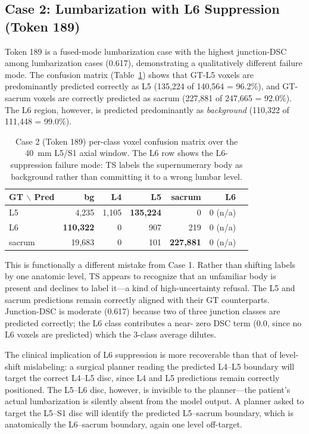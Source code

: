 \documentclass{article}
\begin{document}
\subsection{Case 2: Lumbarization with L6 Suppression
            (Token 189)}
\label{sec:case189}

Token 189 is a fused-mode lumbarization case with the highest
junction-DSC among lumbarization cases (0.617), demonstrating a
qualitatively different failure mode.
The confusion matrix (Table~\ref{tab:case189_confusion}) shows
that GT-L5 voxels are predominantly predicted correctly as L5
(135{,}224 of 140{,}564 = 96.2\%), and GT-sacrum voxels are
correctly predicted as sacrum (227{,}881 of 247{,}665 = 92.0\%).
The L6 region, however, is predicted predominantly as
\emph{background} (110{,}322 of 111{,}448 = 99.0\%).

\begin{table}[t]
\caption{Case 2 (Token 189) per-class voxel confusion matrix over
the 40~mm L5/S1 axial window. The L6 row shows the L6-suppression
failure mode: TS labels the supernumerary body as background
rather than committing it to a wrong lumbar level.}
\label{tab:case189_confusion}
\centering
\small
\begin{tabular}{lrrrrrr}
\toprule
\bfseries GT $\backslash$ Pred & \bfseries bg & \bfseries L4 & \bfseries L5 & \bfseries sacrum & \bfseries L6 \\
\midrule
L5     & 4{,}235          & 1{,}105 & \textbf{135{,}224} & 0                  & 0 (n/a) \\
L6     & \textbf{110{,}322} & 0     & 907                & 219                & 0 (n/a) \\
sacrum & 19{,}683         & 0       & 101                & \textbf{227{,}881} & 0 (n/a) \\
\bottomrule
\end{tabular}
\end{table}

This is functionally a different mistake from Case 1.
Rather than shifting labels by one anatomic level, TS appears
to recognize that an unfamiliar body is present and declines to
label it---a kind of high-uncertainty refusal.
The L5 and sacrum predictions remain correctly aligned with their
GT counterparts.
Junction-DSC is moderate (0.617) because two of three junction
classes are predicted correctly; the L6 class contributes a near-
zero DSC term (0.0, since no L6 voxels are predicted) which the
3-class average dilutes.

The clinical implication of L6 suppression is more recoverable
than that of level-shift mislabeling: a surgical planner reading
the predicted L4--L5 boundary will target the correct
L4--L5 disc, since L4 and L5 predictions remain correctly
positioned.
The L5--L6 disc, however, is invisible to the planner---the
patient's actual lumbarization is silently absent from the model
output.
A planner asked to target the L5--S1 disc will identify the
predicted L5--sacrum boundary, which is anatomically the
L6--sacrum boundary, again one level off-target.
\end{document}
